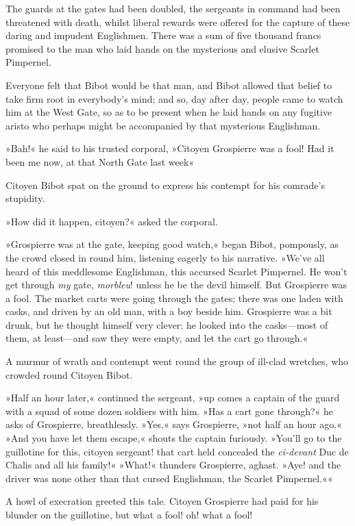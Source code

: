 The guards at the gates had been doubled, the sergeants in command had been threatened with death, whilst liberal rewards were offered for the capture of these daring and impudent Englishmen. There was a sum of five thousand francs promised to the man who laid hands on the mysterious and elusive Scarlet Pimpernel.

Everyone felt that Bibot would be that man, and Bibot allowed that belief to take firm root in everybody's mind; and so, day after day, people came to watch him at the West Gate, so as to be present when he laid hands on any fugitive aristo who perhaps might be accompanied by that mysterious Englishman.

»Bah!« he said to his trusted corporal, »Citoyen Grospierre was a fool! Had it been me now, at that North Gate last week\textellipsis«

Citoyen Bibot spat on the ground to express his contempt for his comrade's stupidity.

»How did it happen, citoyen?« asked the corporal.

»Grospierre was at the gate, keeping good watch,« began Bibot, pompously, as the crowd closed in round him, listening eagerly to his narrative. »We've all heard of this meddlesome Englishman, this accursed Scarlet Pimpernel. He won't get through \textit{my} gate, \textit{morbleu}! unless he be the devil himself. But Grospierre was a fool. The market carts were going through the gates; there was one laden with casks, and driven by an old man, with a boy beside him. Grospierre was a bit drunk, but he thought himself very clever; he looked into the casks—most of them, at least—and saw they were empty, and let the cart go through.«

A murmur of wrath and contempt went round the group of ill-clad wretches, who crowded round Citoyen Bibot.

»Half an hour later,« continued the sergeant, »up comes a captain of the guard with a squad of some dozen soldiers with him. »Has a cart gone through?« he asks of Grospierre, breathlessly. »Yes,« says Grospierre, »not half an hour ago.« »And you have let them escape,« shouts the captain furiously. »You'll go to the guillotine for this, citoyen sergeant! that cart held concealed the \textit{ci-devant} Duc de Chalis and all his family!« »What!« thunders Grospierre, aghast. »Aye! and the driver was none other than that cursed Englishman, the Scarlet Pimpernel.««

A howl of execration greeted this tale. Citoyen Grospierre had paid for his blunder on the guillotine, but what a fool! oh! what a fool!

